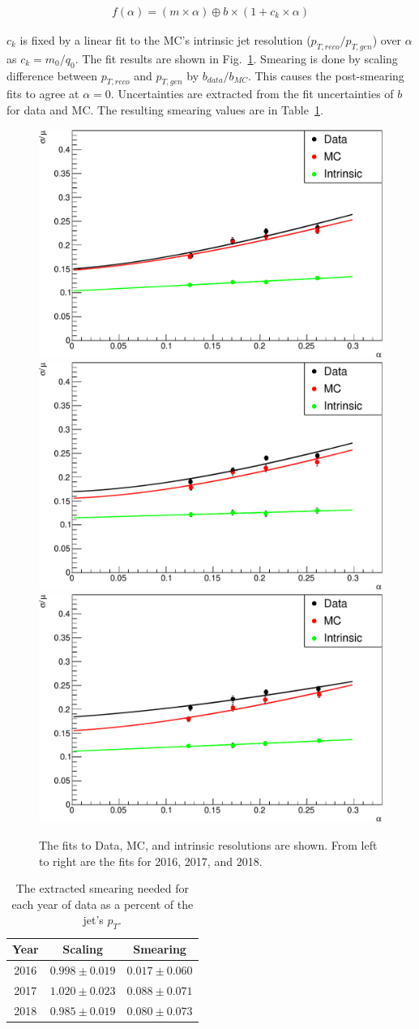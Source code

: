 \begin{gather}
  f(\alpha) = (m \times \alpha) \oplus b \times (1 + c_k \times \alpha)
\end{gather}

$c_k$ is fixed by a linear fit to the MC's intrinsic jet resolution
($p_{T, reco}/p_{T, gen}$) over $\alpha$ as $c_k = m_0/q_0$.
The fit results are shown in Fig.~\ref{fig:jetsmear-fits}.
Smearing is done by scaling difference between
$p_{T,reco}$ and $p_{T,gen}$ by $b_{data}/b_{MC}$.
This causes the post-smearing fits to agree at $\alpha = 0$.
Uncertainties are extracted from the fit uncertainties of $b$ for data and MC.
The resulting smearing values are in Table~\ref{tab:jetsmear-res}.

\begin{figure}
  \centering
  \includegraphics[width=0.3\linewidth]{figures/201015_smear_201015_2016_tight_divmean/resolution_jet1_adjusted_response_smear_0.pdf}
  \includegraphics[width=0.3\linewidth]{figures/201012_smear_201012_2017_tight_divmean/resolution_jet1_adjusted_response_smear_0.pdf}
  \includegraphics[width=0.3\linewidth]{figures/201004_smear_201002_2018_divmean/resolution_jet1_adjusted_response_smear_0.pdf}
  \caption[Resolution fits for jet smearing]{
    The fits to Data, MC, and intrinsic resolutions are shown.
    From left to right are the fits for 2016, 2017, and 2018.
  }
  \label{fig:jetsmear-fits}
\end{figure}

\begin{table}
  \centering
  \caption[$b$-jet energy smearing parameters]{
    The extracted smearing needed for each year of data as a percent of the jet's $p_T$.
  }
  \begin{tabular}{c|c|c}
    \hline
    Year & Scaling & Smearing \\
    \hline
    2016 & $0.998 \pm 0.019$ & $0.017 \pm 0.060$ \\
    2017 & $1.020 \pm 0.023$ & $0.088 \pm 0.071$ \\
    2018 & $0.985 \pm 0.019$ & $0.080 \pm 0.073$ \\
    \hline
  \end{tabular}
  \label{tab:jetsmear-res}
\end{table}


